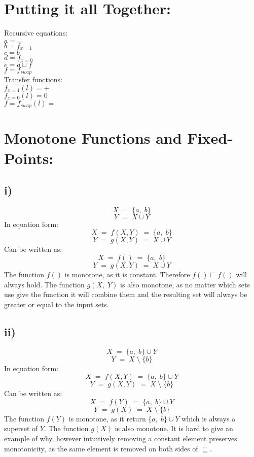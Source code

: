 \documentclass{article}
\begin{document}


\section*{Putting it all Together:}
Recursive equations:\\
$a = \bot $\\
$b = f_{x = 1}$\\
$c = b $\\
$d = f_{x = 0}$\\
$e = d \sqcup f $\\
$f = f_{swap}$\\

\noindent Transfer functions:\\
$f_{x = 1}(l) = + $\\
$f_{x = 0}(l) = 0 $\\
$f = f_{swap}(l) = $\\


\section*{Monotone Functions and Fixed-Points:}

\subsection*{i)}
$$X\;=\;\{a,\;b\}$$
$$Y\;=\;X\cup Y$$
In equation form:
$$X\;=\;f(X, Y)\;=\;\{a,\;b\}$$
$$Y\;=\;g(X, Y)\;=\;X\cup Y$$
Can be written as:
$$X\;=\;f()\;=\;\{a,\;b\}$$
$$Y\;=\;g(X, Y)\;=\;X\cup Y$$
The function $f()$ is monotone, as it is constant. Therefore $f() \sqsubseteq f()$ will always hold. The function $g(X,\;Y)$ is also monotone, as no matter which sets use give the function it will combine them and the resulting set will always be greater or equal to the input sets.

\subsection*{ii)}
$$X\;=\;\{a,\;b\}\cup Y$$
$$Y\;=\;X\;\setminus\;\{b\}$$
In equation form:
$$X\;=\;f(X, Y)\;=\;\{a,\;b\}\cup Y$$
$$Y\;=\;g(X, Y)\;=\;X\;\setminus\;\{b\}$$
Can be written as:
$$X\;=\;f(Y)\;=\;\{a,\;b\}\cup Y$$
$$Y\;=\;g(X)\;=\;X\;\setminus\;\{b\}$$
The function $f(Y)$ is monotone, as it return $\{a,\;b\}\cup Y$ which is always a superset of $Y$. The function $g(X)$ is also monotone. It is hard to give an example of why, however intuitively removing a constant element preserves monotonicity, as the same element is removed on both sides of $\sqsubseteq$.
\end{document}
